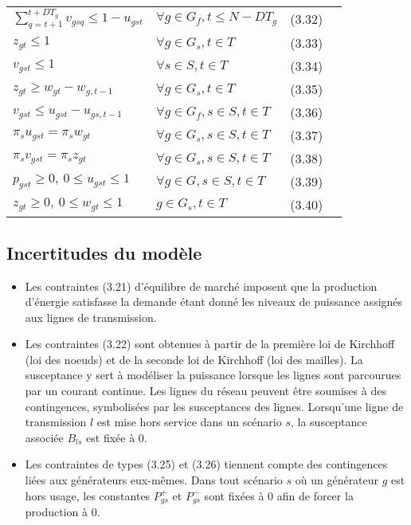 \begin{tabularx}{\textwidth}{l X r r}
$\sum\limits_{q=t+1}^{t+DT_g} v_{gsq} \le 1 - u_{gst}$ & $\forall g \in G_f, t \le N - DT_g$ & (3.32) \\
$z_{gt} \le 1$ & $\forall g \in G_s, t \in T$ & (3.33) \\
$v_{gst} \le 1$ & $\forall s \in S, t \in T$ & (3.34) \\
$z_{gt} \ge w_{gt} - w_{g,t-1}$ & $\forall g \in G_s, t \in T$ & (3.35) \\
$v_{gst} \le u_{gst} - u_{gs,t-1}$ & $\forall g \in G_f, s \in S, t \in T$ & (3.36) \\
$\pi_s u_{gst} = \pi_s w_{gt}$ & $\forall g \in G_s, s \in S, t \in T$ & (3.37) \\
$\pi_s v_{gst} = \pi_s z_{gt}$ & $\forall g \in G_s, s \in S, t \in T$ & (3.38) \\
$p_{gst} \ge 0, \ 0 \le u_{gst} \le 1$ & $\forall g \in G, s \in S, t \in T$ & (3.39) \\
$z_{gt} \ge 0, \ 0 \le w_{gt} \le 1$ & $g \in G_s, t \in T$ & (3.40) \\
\end{tabularx}

\vspace{2cm}

\subsection{Incertitudes du modèle}

\begin{itemize}
    \item Les contraintes (3.21) d'équilibre de marché imposent que la production d'énergie satisfasse la demande étant donné les niveaux de puissance
    assignés aux lignes de transmission.
    \item Les contraintes (3.22) sont obtenues à partir de la première loi de Kirchhoff (loi des noeuds) et de la seconde loi de Kirchhoff
    (loi des mailles). La susceptance y sert à modéliser la puissance lorsque les lignes sont parcourues par un courant continue.
    Les lignes du réseau peuvent être soumises à des contingences, symbolisées par les susceptances des lignes.
    Lorsqu'une ligne de transmission $l$ est mise hors service dans un scénario $s$, la susceptance associée $B_{ls}$ est fixée à 0.
    \item Les contraintes de types (3.25) et (3.26) tiennent compte des contingences liées aux générateurs eux-mêmes.
    Dans tout scénario $s$ où un générateur $g$ est hors usage, les constantes $P_{gs}^{+}$ et $P_{gs}^{-}$ sont fixées à 0 afin de forcer
    la production à 0.
\end{itemize}

